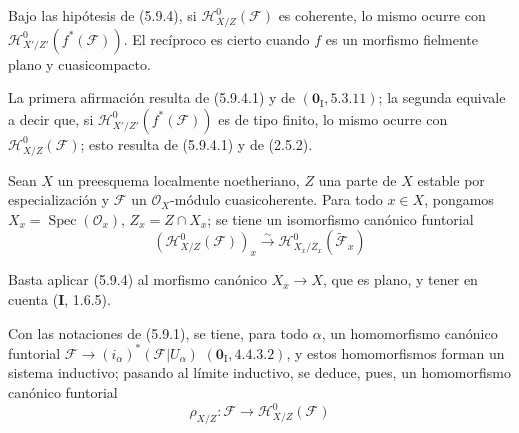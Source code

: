 \begin{corollary}[5.9.5]
\label{IV.2.s5.9.5-fr}
Bajo las hipótesis de \textup{(5.9.4)}, si
$\mathcal H^0_{X/Z}(\mathcal F)$ es coherente, lo mismo ocurre con
$\mathcal H^0_{X'/Z'}(f^*(\mathcal F))$. El recíproco es cierto cuando $f$
es un morfismo fielmente plano y cuasicompacto.
\end{corollary}

La primera afirmación resulta de (5.9.4.1) y de
$(\mathbf{0}_{\mathrm I},5.3.11)$; la segunda equivale a decir que, si
$\mathcal H^0_{X'/Z'}(f^*(\mathcal F))$ es de tipo finito, lo mismo ocurre
con $\mathcal H^0_{X/Z}(\mathcal F)$; esto resulta de (5.9.4.1) y de (2.5.2).

\begin{corollary}[5.9.6]
\label{IV.2.s5.9.6-fr}
Sean $X$ un preesquema localmente noetheriano, $Z$ una parte de $X$ estable
por especialización y $\mathcal F$ un $\mathcal O_X$-módulo cuasicoherente.
Para todo $x\in X$, pongamos $X_x=\operatorname{Spec}(\mathcal O_x)$,
$Z_x=Z\cap X_x$; se tiene un isomorfismo canónico funtorial
\begin{equation}
(\mathcal H^0_{X/Z}(\mathcal F))_x
\xrightarrow{\sim}\mathcal H^0_{X_x/Z_x}(\widetilde{\mathcal F}_x)
\tag{5.9.6.1}\label{IV.2.s5.9.6.1-fr}
\end{equation}
\end{corollary}

Basta aplicar (5.9.4) al morfismo canónico $X_x\to X$, que es plano, y tener
en cuenta (\textbf I, 1.6.5).

\begin{env}[5.9.7]
\label{IV.2.s5.9.7-fr}
Con las notaciones de (5.9.1), se tiene, para todo $\alpha$, un homomorfismo
canónico funtorial
$\mathcal F\longrightarrow(i_\alpha)^*(\mathcal F|U_\alpha)$
$(\mathbf{0}_{\mathrm I},4.4.3.2)$,
y estos homomorfismos forman un sistema inductivo; pasando al límite
inductivo, se deduce, pues, un homomorfismo canónico funtorial
\begin{equation}
\rho_{X/Z}:\mathcal F\longrightarrow\mathcal H^0_{X/Z}(\mathcal F)
\tag{5.9.7.1}\label{IV.2.s5.9.7.1-fr}
\end{equation}
\end{env}

